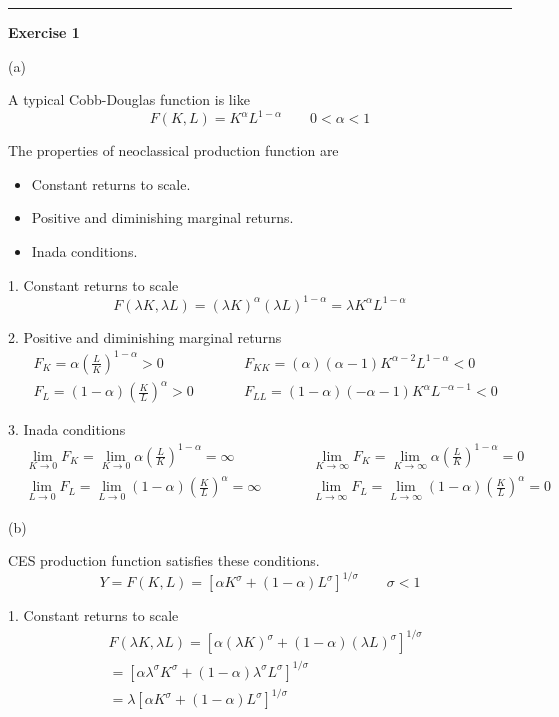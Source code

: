 \documentclass[letterpaper, 11pt]{article}
\newcommand{\1}{\mathds{1}}	%
\theoremstyle{definition}
\begin{document}
\bigskip
\hrule
\bigskip

\textbf{Exercise 1}

(a)

A typical Cobb-Douglas function is like \[
  F(K,L) = K^\alpha L^{1-\alpha} \qquad 0<\alpha<1
\]

The properties of neoclassical production function are \begin{itemize}
  \item Constant returns to scale.
  \item Positive and diminishing marginal returns.
  \item Inada conditions.
\end{itemize}

1. Constant returns to scale \[
  F(\lambda K, \lambda L) = (\lambda K)^\alpha(\lambda L)^{1-\alpha} = \lambda K^\alpha L^{1-\alpha}
\]

2. Positive and diminishing marginal returns \begin{align*}
   & F_K = \alpha (\frac{L}{K})^{1-\alpha} > 0 \qquad   &  & F_{KK} = (\alpha)(\alpha - 1)K^{\alpha -2}L^{1-\alpha} < 0 \\
   & F_L = (1-\alpha) (\frac{K}{L})^{\alpha} > 0 \qquad &  & F_{LL} = (1-\alpha)(-\alpha-1)K^\alpha L^{-\alpha-1} < 0
\end{align*}

3. Inada conditions \begin{align*}
   & \lim_{K \to 0} F_K  = \lim_{K \to 0}\alpha (\frac{L}{K})^{1-\alpha} = \infty \qquad   &  & \lim_{K \to \infty} F_K  =\lim_{K \to \infty}  \alpha (\frac{L}{K})^{1-\alpha}= 0   \\
   & \lim_{L \to 0} F_L = \lim_{L \to 0}(1-\alpha) (\frac{K}{L})^{\alpha}  = \infty \qquad &  & \lim_{L \to \infty} F_L = \lim_{L \to \infty} (1-\alpha) (\frac{K}{L})^{\alpha} = 0
\end{align*}

(b)

CES production function satisfies these conditions. \[
  Y = F(K,L) =\left[ \alpha K^{\sigma}  + (1-\alpha)L ^{\sigma}\right]^{1/\sigma} \qquad \sigma < 1
\]

1. Constant returns to scale \begin{align*}
   & F(\lambda K, \lambda L) = \left[ \alpha (\lambda K)^{\sigma}  + (1-\alpha)(\lambda L) ^{\sigma}\right]^{1/\sigma} \\
   & = \left[\alpha \lambda^{\sigma}K^{\sigma} + (1-\alpha)\lambda^{\sigma}L^{\sigma}\right]^{1/\sigma}                \\
   & = \lambda \left[ \alpha K^{\sigma}  + (1-\alpha)L ^{\sigma}\right]^{1/\sigma}
\end{align*}
\end{document}
